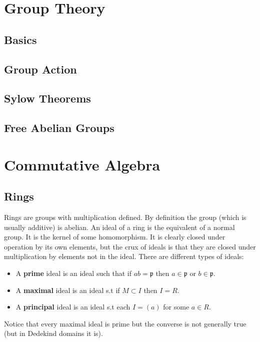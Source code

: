 \documentclass[12pt]{book}
\begin{document}
 
 \chapter{Group Theory}
 
  \section{Basics}
 
 \section{Group Action}
 
 \section{Sylow Theorems}
 
 \section{Free Abelian Groups}
 
\chapter{Commutative Algebra}
 \section{Rings}
 Rings are groups with multiplication defined. By definition the group (which is usually additive) is abelian. An ideal of a ring is the equivalent of a normal group. It is the kernel of some homomorphism. It is clearly closed under operation by its own elements, but the crux of ideals is that they are closed under multiplication by elements not in the ideal. There are different types of ideals:
 \begin{itemize}
 \item A \textbf{prime} ideal is an ideal such that if $ab=\mathfrak{p}$ then $a \in \mathfrak{p}$ or $b \in \mathfrak{p}$.
 \item A \textbf{maximal} ideal is an ideal s.t if $M \subset I$ then $I=R$.
 \item A \textbf{principal} ideal is an ideal s.t each $I=(a)$ for some $a \in R$.
 \end{itemize}
 Notice that every maximal ideal is prime but the converse is not generally true (but in Dedekind domains it is). 
 
\end{document}
